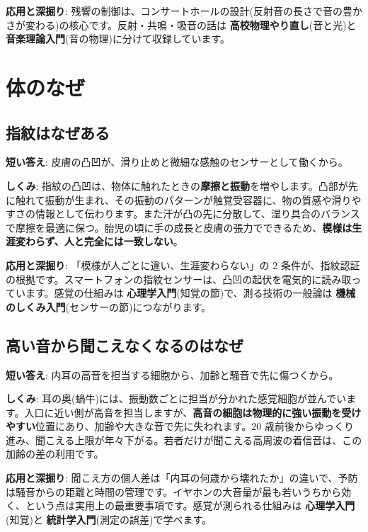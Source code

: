 \documentclass{article}
\begin{document}
\textbf{応用と深掘り}: 残響の制御は、コンサートホールの設計(反射音の長さで音の豊かさが変わる)の核心です。反射・共鳴・吸音の話は \textbf{高校物理やり直し}(音と光)と \textbf{音楽理論入門}(音の物理)に分けて収録しています。

\section{体のなぜ}

\subsection{指紋はなぜある}

\textbf{短い答え}: 皮膚の凸凹が、滑り止めと微細な感触のセンサーとして働くから。

\textbf{しくみ}: 指紋の凸凹は、物体に触れたときの\textbf{摩擦と振動}を増やします。凸部が先に触れて振動が生まれ、その振動のパターンが触覚受容器に、物の質感や滑りやすさの情報として伝わります。また汗が凸の先に分散して、湿り具合のバランスで摩擦を最適に保つ。胎児の頃に手の成長と皮膚の張力でできるため、\textbf{模様は生涯変わらず、人と完全には一致しない}。

\textbf{応用と深掘り}: 「模様が人ごとに違い、生涯変わらない」の 2 条件が、指紋認証の根拠です。スマートフォンの指紋センサーは、凸凹の起伏を電気的に読み取っています。感覚の仕組みは \textbf{心理学入門}(知覚の節)で、測る技術の一般論は \textbf{機械のしくみ入門}(センサーの節)につながります。

\subsection{高い音から聞こえなくなるのはなぜ}

\textbf{短い答え}: 内耳の高音を担当する細胞から、加齢と騒音で先に傷つくから。

\textbf{しくみ}: 耳の奥(蝸牛)には、振動数ごとに担当が分かれた感覚細胞が並んでいます。入口に近い側が高音を担当しますが、\textbf{高音の細胞は物理的に強い振動を受けやすい}位置にあり、加齢や大きな音で先に失われます。20 歳前後からゆっくり進み、聞こえる上限が年々下がる。若者だけが聞こえる高周波の着信音は、この加齢の差の利用です。

\textbf{応用と深掘り}: 聞こえ方の個人差は「内耳の何歳から壊れたか」の違いで、予防は騒音からの距離と時間の管理です。イヤホンの大音量が最も若いうちから効く、という点は実用上の最重要事項です。感覚が測られる仕組みは \textbf{心理学入門}(知覚)と \textbf{統計学入門}(測定の誤差)で学べます。
\end{document}
